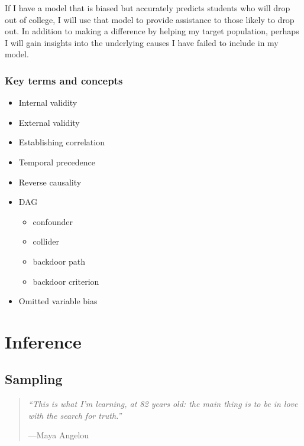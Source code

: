 \documentclass[
]{book}
\providecommand{\tightlist}{%
  \setlength{\itemsep}{0pt}\setlength{\parskip}{0pt}}
\newenvironment{learncheck}%
{%
  \par\vspace{\baselineskip}\noindent 
  \color{Exercise}\begin{itshape}%
  \par\vspace{\baselineskip}\noindent\ignorespaces 
}%
{%
  \end{itshape}\ignorespacesafterend 
}
\begin{document}
If I have a model that is biased but accurately predicts students who will drop out of college, I will use that model to provide assistance to those likely to drop out. In addition to making a difference by helping my target population, perhaps I will gain insights into the underlying causes I have failed to include in my model.

\hypertarget{kt9}{%
\section{Key terms and concepts}\label{kt9}}

\begin{learncheck}
\begin{itemize}
\tightlist
\item
  Internal validity
\item
  External validity
\item
  Establishing correlation
\item
  Temporal precedence
\item
  Reverse causality
\item
  DAG

  \begin{itemize}
  \tightlist
  \item
    confounder
  \item
    collider
  \item
    backdoor path
  \item
    backdoor criterion
  \end{itemize}
\item
  Omitted variable bias
\end{itemize}
\end{learncheck}

\hypertarget{part-inference}{%
\part{Inference}\label{part-inference}}

\hypertarget{sampling}{%
\chapter{Sampling}\label{sampling}}

\begin{quote}
\emph{``This is what I'm learning, at 82 years old: the main thing is to be in love with the search for truth.''}

---Maya Angelou
\end{quote}
\end{document}
